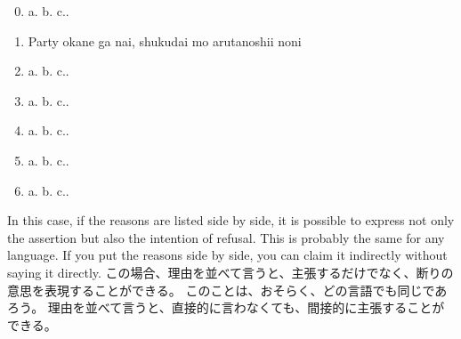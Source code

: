 \documentclass[uplatex,dvipdfmx,b5paper,english,10pt]{jsbook}
\begin{document}
\begin{enumerate}
 \setcounter{enumi}{-1}
 \item a.\underline{\hspace{6zw}} b.\underline{\hspace{18zw}} c.\underline{\hspace{8.5zw}}.
 \vspace{-1.1\baselineskip}
 \item[] \hspace{2zw}Party\hspace{4zw} okane ga nai, shukudai mo aru\hspace{5zw}tanoshii noni
 \item a.\underline{\hspace{6zw}} b.\underline{\hspace{18zw}} c.\underline{\hspace{8.5zw}}.
 \item a.\underline{\hspace{6zw}} b.\underline{\hspace{18zw}} c.\underline{\hspace{8.5zw}}.
 \item a.\underline{\hspace{6zw}} b.\underline{\hspace{18zw}} c.\underline{\hspace{8.5zw}}.
 \item a.\underline{\hspace{6zw}} b.\underline{\hspace{18zw}} c.\underline{\hspace{8.5zw}}.
 \item a.\underline{\hspace{6zw}} b.\underline{\hspace{18zw}} c.\underline{\hspace{8.5zw}}.
\end{enumerate}

\begin{toianswer}
\ifEnglish
In this case, if the reasons are listed side by side, it is possible to express not only the assertion but also the intention of refusal.
This is probably the same for any language.
If you put the reasons side by side, you can claim it indirectly without saying it directly.
\else
この場合、理由を並べて言うと、主張するだけでなく、断りの意思を表現することができる。
このことは、おそらく、どの言語でも同じであろう。
理由を並べて言うと、直接的に言わなくても、間接的に主張することができる。
\fi
\end{toianswer}
\end{document}
